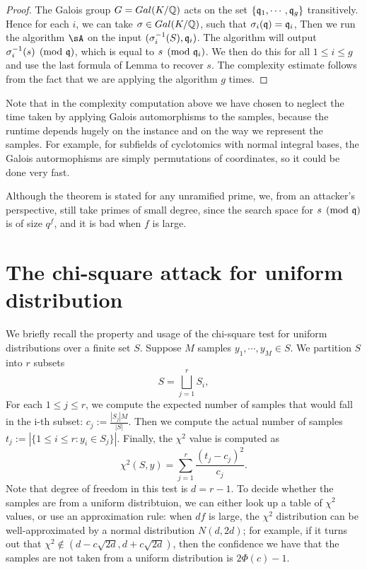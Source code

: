 \documentclass{amsart}
\begin{document}
\begin{proof}
The Galois group $G =Gal(K/\mathbb{Q})$ acts on the set $\{\mathfrak{q}_1, \cdots ,\mathfrak{q}_g\}$ transitively. Hence for each $i$, we can take $\sigma \in Gal(K/\mathbb{Q})$, such that $\sigma_i(\mathfrak{q}) = \mathfrak{q}_i$, Then we run the algorithm $\sA$ on the input $(\sigma_i^{-1}(S), \mathfrak{q}_i)$. The algorithm will output $\sigma_i^{-1}(s) \pmod{\mathfrak{q}}$, which is equal to $s \pmod{\mathfrak{q}_i}$. We then do this for all $1\leq i \leq g$ and use the last formula of Lemma to recover $s$. The complexity estimate follows from the fact that we are applying the algorithm $g$ times.
\end{proof}

\begin{remark}
Note that in the complexity computation above we have chosen to neglect the time taken by applying Galois automorphisms to the samples, because the runtime depends
hugely on the instance and on the way we represent the samples. For example, for subfields of cyclotomics with normal integral bases, the Galois autormophisms are simply permutations of coordinates, so it could be done very fast.
\end{remark}

\begin{remark}
Although the theorem is stated for any unramified prime, we, from an attacker's perspective, still take primes of small degree, since the search space for $s \pmod{\mathfrak{q}}$ is of size $q^f$, and it is bad when $f$ is large.
\end{remark}

\section{The chi-square attack for uniform distribution}

We briefly recall the property and usage of the chi-square test for uniform distributions over a finite set $S$. Suppose  $M$ samples $y_1, \cdots, y_M \in S$. We partition $S$ into $r$ subsets
\[
    S = \bigsqcup_{j=1}^r S_i,
\]
For each $1 \leq j \leq r$, we compute the expected number of samples that would fall in the i-th subset: $c_j := \frac{|S_j|M}{|S|}$. Then we compute the actual number of samples $t_j := |\{1 \leq i \leq r: y_i \in S_j\}|$. Finally, the $\chi^2$ value is computed as
\[
    \chi^2(S,y) = \sum_{j = 1}^r \frac{(t_j -c_j)^2}{c_j}.
\]
Note that degree of freedom in this test is $d = r-1$.
To decide whether the samples are from a uniform distribtuion, we can either look up a table of $\chi^2$ values, or use an approximation rule:  when $df$ is large, the $\chi^2$ distribution can be well-approximated by a normal distribution $N(d, 2d)$; for example, if it turns out that $\chi^2 \notin (d - c \sqrt{2d}, d+ c \sqrt{2d})$, then the confidence we have that the samples are not taken from a uniform distribution is $2\Phi(c) - 1$.
\end{document}

